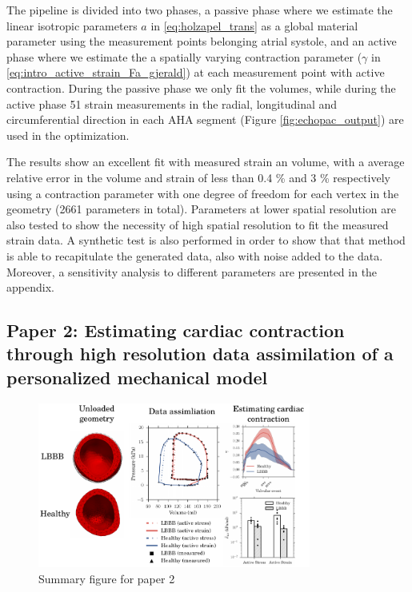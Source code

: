 The pipeline is divided into two phases, a passive phase where we
estimate the linear isotropic parameters $a$ in
\eqref{eq:holzapel_trans} as a global material parameter using the
measurement points belonging atrial systole, and an active phase where we estimate the
a spatially varying contraction parameter ($\gamma$ in
\eqref{eq:intro_active_strain_Fa_gjerald}) at each measurement point
with active contraction. During the passive phase we only fit the
volumes, while during the active phase 51 strain measurements in the radial,
longitudinal and circumferential direction in each AHA segment (Figure
\ref{fig:echopac_output}) are used in the optimization. 

The results show an excellent fit with measured strain an volume, with
a average relative error in the volume and strain of less than 0.4 \% and 3 \%
respectively using a contraction parameter with one degree of freedom
for each vertex in the geometry (2661 parameters in total). Parameters
at lower spatial resolution are also tested to show the necessity of
high spatial resolution to fit the measured strain data.
A synthetic test is also performed in order to show that that method
is able to recapitulate the generated data, also with noise added to
the data. Moreover, a sensitivity analysis to different parameters are
presented in the appendix.


\subsection{Paper 2: Estimating cardiac contraction through high resolution
  data assimilation of a personalized mechanical model}


\begin{figure}[htbp]
  \centering
    \includegraphics[width=0.8\textwidth]{chapters/introduction/figures/paper2}
\caption{Summary figure for paper 2}
\label{fig:paper2}
\end{figure}

